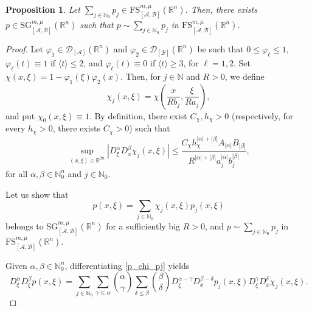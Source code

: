 \documentclass[11pt,reqno]{amsart}
\numberwithin{equation}{section}
\newtheorem{proposition}[theorem]{Proposition}
\newcommand{\R}{{\mathbb{R}}} %
\newcommand{\N}{{\mathbb{N}}} %
\newcommand{\SG}{{\mathrm{SG}}}
\newcommand{\FS}{{\mathrm{FS}}}
\newcommand{\A}{{\mathcal{A}}} %
\newcommand{\B}{{\mathcal{B}}} %
\begin{document}
\begin{proposition}\label{prop_p_pj}
	Let $\sum_{j\in\N_0}p_j\in \FS_{[\A,\B]}^{m,\mu}(\R^n)$. Then, there exists $p\in {\SG}_{[\A,\B]}^{m,\mu}(\R^n)$ such that $p\sim \sum_{j\in\N_0}p_j$ in $\FS_{[\A,\B]}^{m,\mu}(\R^n)$.
\end{proposition}
%
\begin{proof}
	Let $\varphi_1\in\mathcal{D}_{[\A]}(\R^n)$ and $\varphi_2\in\mathcal{D}_{[\B]}(\R^n)$ be such that $0\leq\varphi_\ell\leq 1$, $\varphi_\ell(t)\equiv 1$ if $\langle t\rangle \leq 2$, and $\varphi_\ell(t)\equiv 0$ if $\langle t\rangle \geq 3$, for $\ell=1,2$. Set $\chi(x,\xi)=1-\varphi_1(\xi)\varphi_2(x)$. Then, for $j\in\N$ and $R>0$, we define
	\[\chi_j(x,\xi)=\chi\left(\frac{x}{Rb_j},\frac{\xi}{Ra_j}\right),\]
	and put $\chi_0(x,\xi)\equiv 1$. By definition, there exist $C_\chi,h_\chi>0$ (respectively, for every $h_\chi>0$, there exists $C_\chi>0$) such that
	\begin{equation}\label{der_chi_j}
		\sup_{(x,\xi)\in\R^{2n}}|D_\xi^\alpha D_x^\beta \chi_j(x,\xi)| \leq \frac{C_\chi h_\chi^{|\alpha|+|\beta|}A_{|\alpha|}B_{|\beta|}}{R^{|\alpha|+|\beta|}a_j^{|\alpha|}b_j^{|\beta|}},
	\end{equation}
	for all $\alpha,\beta\in\N_0^n$ and $j\in\N_0$.
	
	Let us show that
	\begin{equation}\label{p_chi_pj}
	p(x,\xi) = \sum_{j\in\N_0}\chi_j(x,\xi)p_j(x,\xi)
	\end{equation} 
	belongs to ${\SG}_{[\A,\B]}^{m,\mu}(\R^n)$ for a sufficiently big $R>0$, and $p\sim \sum_{j\in\N_0}p_j$ in $\FS_{[\A,\B]}^{m,\mu}(\R^n)$.
	
	Given $\alpha,\beta\in\N_0^n$, differentiating \eqref{p_chi_pj} yields
	\begin{equation*}
		D_\xi^\alpha D_\xi^\beta p(x,\xi) = \sum_{j\in\N_0} \sum_{\gamma\leq\alpha}\binom{\alpha}{\gamma} \sum_{\delta\leq\beta}\binom{\beta}{\delta} D_\xi^{\alpha-\gamma}D_x^{\beta-\delta}p_j(x,\xi) D_\xi^\gamma D_x^\delta \chi_j(x,\xi).
	\end{equation*}
	

\end{proof}
\end{document}
